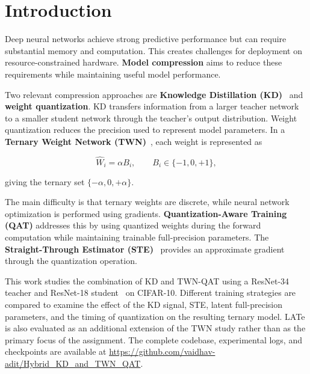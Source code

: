 \documentclass[conference]{IEEEtran}
\begin{document}
\section{Introduction}

Deep neural networks achieve strong predictive performance but can
require substantial memory and computation. This creates challenges for
deployment on resource-constrained hardware. \textbf{Model compression}
aims to reduce these requirements while maintaining useful model
performance.

Two relevant compression approaches are \textbf{Knowledge Distillation
(KD)}~\cite{hinton2015} and \textbf{weight quantization}. KD transfers
information from a larger teacher network to a smaller student network
through the teacher's output distribution. Weight quantization reduces the
precision used to represent model parameters. In a
\textbf{Ternary Weight Network (TWN)}~\cite{li2016,zhu2017}, each weight
is represented as

\begin{equation}
\hat{W}_i = \alpha B_i,
\qquad
B_i \in \{-1,0,+1\},
\end{equation}

giving the ternary set $\{-\alpha,0,+\alpha\}$.

The main difficulty is that ternary weights are discrete, while neural
network optimization is performed using gradients.
\textbf{Quantization-Aware Training (QAT)} addresses this by using
quantized weights during the forward computation while maintaining
trainable full-precision parameters. The
\textbf{Straight-Through Estimator (STE)}~\cite{bengio2013,yin2019}
provides an approximate gradient through the quantization operation.

This work studies the combination of KD and TWN-QAT using a ResNet-34
teacher and ResNet-18 student~\cite{he2016} on CIFAR-10. Different training
strategies are compared to examine the effect of the KD signal, STE, latent
full-precision parameters, and the timing of quantization on the
resulting ternary model. LATe is also evaluated as an additional
extension of the TWN study rather than as the primary focus of the
assignment. The complete codebase, experimental logs, and checkpoints are
available at \url{https://github.com/vaidhav-adit/Hybrid_KD_and_TWN_QAT}.

\end{document}
